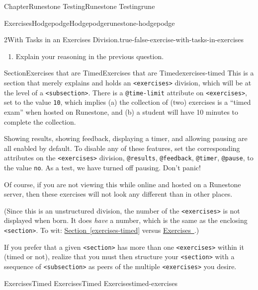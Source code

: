 \documentclass[oneside,10pt,]{book}
\newcommand{\xreffont}{\relax}
\newcommand{\mono}[1]{\texttt{#1}}
\numberwithin{equation}{section}
\begin{document}
\begin{chapterptx}{Chapter}{Runestone Testing}{}{Runestone Testing}{}{}{rune}
\begin{exercises-section}{Exercises}{Hodgepodge}{}{Hodgepodge}{}{}{runestone-hodgepodge}
\begin{divisionexercise}{2}{With Tasks in an Exercises Division.}{}{true-false-exercise-with-tasks-in-exercises}
\begin{enumerate}[font=\bfseries,label=(\alph*),ref=\alph*]
The vector space of all polynomials with finite degree has a basis, \(B = \{1,x,x^2,x^3,\dots\}\), which is infinte.%
\item{}Explain your reasoning in the previous question.%
\end{enumerate}%
\end{divisionexercise}%
\end{exercises-section}
%
%
\typeout{************************************************}
\typeout{************************************************}
%
\begin{sectionptx}{Section}{Exercises that are Timed}{}{Exercises that are Timed}{}{}{exercises-timed}
This is a section that merely explains and holds an \mono{<exercises>} division, which will be at the level of a \mono{<subsection>}.  There is a \mono{@time-limit} attribute on \mono{<exercises>}, set to the value \mono{10}, which implies (a) the collection of (two) exercises is a ``timed exam'' when hosted on Runestone, and (b) a student will have 10 minutes to complete the collection.%
\par
Showing results, showing feedback, displaying a timer, and allowing pausing are all enabled by default.  To disable any of these features, set the corresponding attributes on the \mono{<exercises>} division, \mono{@results}, \mono{@feedback}, \mono{@timer}, \mono{@pause}, to the value \mono{no}.  As a test, we have turned off pausing.  Don't panic!%
\par
Of course, if you are not viewing this while online and hosted on a Runestone server, then these exercises will not look any different than in other places.%
\par
(Since this is an unstructured division, the number of the \mono{<exercises>} is not displayed when born.  It does \emph{have} a number, which is the same as the enclosing \mono{<section>}.  To wit: \hyperref[exercises-timed]{Section~{\xreffont\ref{exercises-timed}}} versus \hyperlink{timed-exercises}{Exercises~{\xreffont 5.21}}.)%
\par
If you prefer that a given \mono{<section>} has more than one \mono{<exercises>} within it (timed or not), realize that you must then structure your \mono{<section>} with a ssequence of \mono{<subsection>} as peers of the multiple \mono{<exercises>} you desire.%
%
%
\typeout{************************************************}
\typeout{************************************************}
%
\begin{exercises-subsection-numberless}{Exercises}{Timed Exercises}{}{Timed Exercises}{}{}{timed-exercises}

\end{exercises-subsection-numberless}
\end{sectionptx}
\end{chapterptx}
\end{document}
